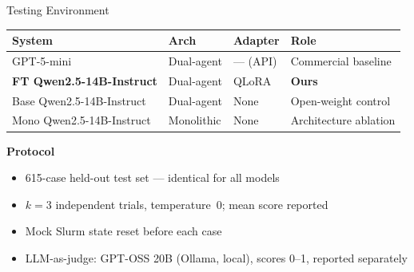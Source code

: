 \begin{frame}{Testing Environment}
  \renewcommand{\arraystretch}{1.25}
  \begin{tabular}{llll}
    \toprule
    \textbf{System} & \textbf{Arch} & \textbf{Adapter} & \textbf{Role} \\
    \midrule
    GPT-5-mini            & Dual-agent & — (API)   & Commercial baseline \\
    \textbf{FT Qwen2.5-14B-Instruct} & Dual-agent & QLoRA     & \textbf{Ours} \\
    Base Qwen2.5-14B-Instruct      & Dual-agent & None      & Open-weight control \\
    Mono Qwen2.5-14B-Instruct      & Monolithic & None      & Architecture ablation \\
    \bottomrule
  \end{tabular}
  \vspace{0.6em}

  \textbf{Protocol}
  \begin{itemize}\setlength{\itemsep}{3pt}
    \item 615-case held-out test set — identical for all models
    \item $k{=}3$ independent trials, temperature~0; mean score reported
    \item Mock Slurm state reset before each case
    \item LLM-as-judge: GPT-OSS 20B (Ollama, local), scores 0--1, reported separately
  \end{itemize}
\end{frame}
